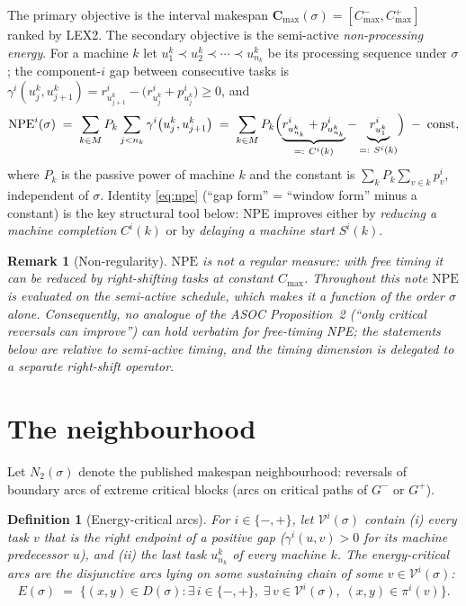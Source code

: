 \documentclass[11pt,a4paper]{article}
\newtheorem{definition}{Definition}
\newtheorem{remark}{Remark}
\newcommand{\Cmax}{C_{\max}}
\newcommand{\NPE}{\mathrm{NPE}}
\begin{document}
The primary objective is the interval makespan
$\mathbf{C}_{\max}(\sigma)=[C^-_{\max},C^+_{\max}]$ ranked by LEX2. The
secondary objective is the semi-active \emph{non-processing energy}. For a
machine $k$ let $u_1^k\prec u_2^k\prec\cdots\prec u_{n_k}^k$ be its
processing sequence under $\sigma$; the component-$i$ gap between
consecutive tasks is
$\gamma^i(u_j^k,u_{j+1}^k)=r^i_{u_{j+1}^k}-\bigl(r^i_{u_j^k}+p^i_{u_j^k}\bigr)\ge 0$,
and
\begin{equation}\label{eq:npe}
\NPE^i(\sigma)\;=\;\sum_{k\in M} P_k \sum_{j<n_k}\gamma^i\bigl(u^k_j,u^k_{j+1}\bigr)
\;=\;\sum_{k\in M} P_k\Bigl(\underbrace{r^i_{u^k_{n_k}}+p^i_{u^k_{n_k}}}_{=:~C^i(k)}
-\underbrace{r^i_{u^k_1}}_{=:~S^i(k)}\Bigr)\;-\;\text{const},
\end{equation}
where $P_k$ is the passive power of machine $k$ and the constant is
$\sum_k P_k\sum_{v\in k}p^i_v$, independent of $\sigma$. Identity
\eqref{eq:npe} (``gap form'' = ``window form'' minus a constant) is the
key structural tool below: NPE improves either by \emph{reducing a machine
completion} $C^i(k)$ or by \emph{delaying a machine start} $S^i(k)$.

\begin{remark}[Non-regularity]\label{rem:nonregular}
$\NPE$ is not a regular measure: with free timing it can be reduced by
right-shifting tasks at constant $\Cmax$. Throughout this note $\NPE$ is
evaluated on the \emph{semi-active} schedule, which makes it a function of
the order $\sigma$ alone. Consequently, no analogue of the ASOC
Proposition~2 (``only critical reversals can improve'') can hold verbatim
for free-timing NPE; the statements below are relative to semi-active
timing, and the timing dimension is delegated to a separate right-shift
operator.
\end{remark}

\section{The neighbourhood}

Let $N_2(\sigma)$ denote the published makespan neighbourhood: reversals of
boundary arcs of extreme critical blocks (arcs on critical paths of
$G^{-}$ or $G^{+}$).

\begin{definition}[Energy-critical arcs]\label{def:ecrit}
For $i\in\{-,+\}$, let $\mathcal{V}^i(\sigma)$ contain (i) every task $v$
that is the right endpoint of a positive gap
($\gamma^i(u,v)>0$ for its machine predecessor $u$), and (ii) the last task
$u^k_{n_k}$ of every machine $k$. The \emph{energy-critical arcs} are the
disjunctive arcs lying on some sustaining chain of some $v\in
\mathcal{V}^i(\sigma)$:
\[
E(\sigma)\;=\;\bigl\{(x,y)\in D(\sigma) : \exists\, i\in\{-,+\},\;
\exists\, v\in\mathcal{V}^i(\sigma),\; (x,y)\in\pi^i(v)\bigr\}.
\]
\end{definition}
\end{document}
